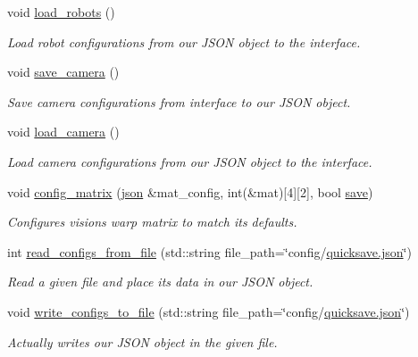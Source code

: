 \begin{DoxyCompactItemize}
void \hyperlink{classjson_save_manager_a6ddf4a28c77c83f37e3771177226c960}{load\+\_\+robots} ()
\begin{DoxyCompactList}\small\item\em Load robot configurations from our J\+S\+ON object to the interface. \end{DoxyCompactList}\item 
void \hyperlink{classjson_save_manager_a437ba67544a0115bf0242c85b92018b3}{save\+\_\+camera} ()
\begin{DoxyCompactList}\small\item\em Save camera configurations from interface to our J\+S\+ON object. \end{DoxyCompactList}\item 
void \hyperlink{classjson_save_manager_a6184c9f744044a5ccdf34c6386275df8}{load\+\_\+camera} ()
\begin{DoxyCompactList}\small\item\em Load camera configurations from our J\+S\+ON object to the interface. \end{DoxyCompactList}\item 
void \hyperlink{classjson_save_manager_ae135d7cd743cba1f0801e80934fdd824}{config\+\_\+matrix} (\hyperlink{json_save_manager_8h_ab701e3ac61a85b337ec5c1abaad6742d}{json} \&mat\+\_\+config, int(\&mat)\mbox{[}4\mbox{]}\mbox{[}2\mbox{]}, bool \hyperlink{classjson_save_manager_a3e628f770c39e0111b46dac21d966171}{save})
\begin{DoxyCompactList}\small\item\em Configures vision\textquotesingle{}s warp matrix to match it\textquotesingle{}s defaults. \end{DoxyCompactList}\item 
int \hyperlink{classjson_save_manager_a71683c4903b413a1311e5b10b519ad41}{read\+\_\+configs\+\_\+from\+\_\+file} (std\+::string file\+\_\+path=\char`\"{}config/\hyperlink{json_save_manager_8h_ab701e3ac61a85b337ec5c1abaad6742d}{quicksave.\+json}\char`\"{})
\begin{DoxyCompactList}\small\item\em Read a given file and place it\textquotesingle{}s data in our J\+S\+ON object. \end{DoxyCompactList}\item 
void \hyperlink{classjson_save_manager_a2be17d434d72a0afeb2d9a2f96b043bf}{write\+\_\+configs\+\_\+to\+\_\+file} (std\+::string file\+\_\+path=\char`\"{}config/\hyperlink{json_save_manager_8h_ab701e3ac61a85b337ec5c1abaad6742d}{quicksave.\+json}\char`\"{})
\begin{DoxyCompactList}\small\item\em Actually writes our J\+S\+ON object in the given file. \end{DoxyCompactList}\end{DoxyCompactItemize}
